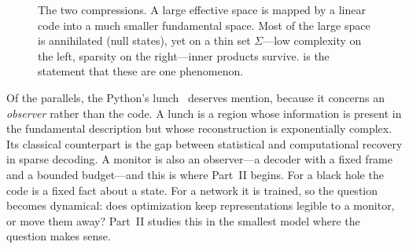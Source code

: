 \documentclass[11pt]{amsart}
\theoremstyle{plain}
\theoremstyle{definition}
\theoremstyle{remark}
\begin{document}
\begin{figure}[t]
\centering\TwoCompressions
\caption{The two compressions. A large effective space is mapped by a linear code into a much smaller
fundamental space. Most of the large space is annihilated (null states), yet on a thin set $\Sigma$---low
complexity on the left, sparsity on the right---inner products survive.  is the statement that
these are one phenomenon.}
\label{fig:two}
\end{figure}

Of the parallels, the Python's lunch~\cite{Lunch} deserves mention, because it concerns an
\emph{observer} rather than the code. A lunch is a region whose information is present in the fundamental
description but whose reconstruction is exponentially complex. Its classical counterpart is the gap between
statistical and computational recovery in sparse decoding. A monitor is also an observer---a decoder with a fixed
frame and a bounded budget---and this is where Part~II begins. For a black hole the code is a fixed fact about a
state. For a network it is trained, so the question becomes dynamical: does optimization keep representations
legible to a monitor, or move them away? Part~II studies this in the smallest model where the question makes
sense.
\end{document}
